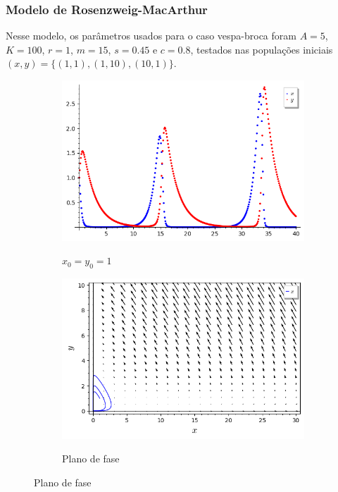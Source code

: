 \subsubsection{Modelo de Rosenzweig-MacArthur}

Nesse modelo, os parâmetros usados para o caso vespa-broca foram $A=5$, $K=100$, $r=1$, $m=15$, $s=0.45$ e $c=0.8$, testados nas populações iniciais $(x,y)=\{(1,1),(1,10),(10,1)\}$.

\begin{figure}[H]
    \centering
    \begin{subfigure}{0.4\textwidth}
        \includegraphics[scale=0.48]{figuras/RM-cana (1,1) plot.png}
        \label{fig:RM-cana_1}
        \caption{$x_0 = y_0 = 1$}
    \end{subfigure}
    \begin{subfigure}{0.4\textwidth}
        \includegraphics[scale=0.48]{figuras/RM-cana (1,1) plano.png}
        \label{fig:RM-cana_2}
        \caption{Plano de fase}
    \end{subfigure}
\end{figure}

